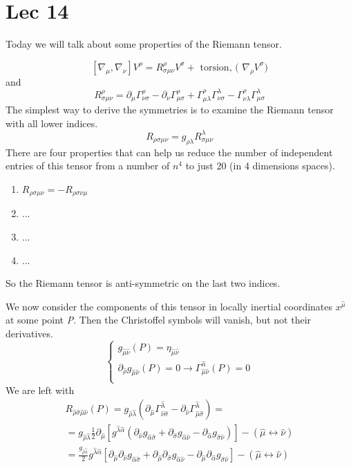 \section{Lec 14}
Today we will talk about some properties of the Riemann tensor.\par
\[
	[\nabla _{\mu }, \nabla _{\nu }] V^{\rho } = R^{\rho }_{\sigma \mu \nu } V^{\sigma } + \text{ torsion, ( } \nabla _{\rho }V^{\sigma }\text{)}
\]
and 
\[
	R^{\rho }_{\sigma \mu \nu } = \partial_{\mu }\Gamma^{\rho }_{\nu \sigma } - \partial_{\nu }\Gamma ^{\rho }_{\mu \sigma } + \Gamma  ^{\rho }_{\mu \lambda } \Gamma ^{\lambda }_{\nu \sigma } -\Gamma ^{\rho }_{\nu \lambda }\Gamma ^{\lambda }_{\mu \sigma }
\]
The simplest way to derive the symmetries is to examine the Riemann tensor with all lower indices.
\[
R_{\rho \sigma \mu \nu } = g_{\rho \lambda } R^{\lambda }_{\sigma \mu \nu }
\]
There are four properties that can help us reduce the number of independent entries of this tensor from a number of $n^{4}$ to just 20 (in 4 dimensions spaces).
\begin{enumerate}
\item $R_{\rho \sigma \mu \nu } = - R_{\rho \sigma \nu \mu } $ 
\item ... 
	\item ...
	\item ...
\end{enumerate}
So the Riemann tensor is anti-symmetric on the last two indices.\par
We now consider the components of this tensor in locally inertial coordinates $x^{\hat{\mu }}$ at some point \emph{P}. Then the Christoffel symbols will vanish, but not their derivatives.
\begin{equation}
\begin{cases}
g_{\hat{\mu }\hat{\nu }} \left( P \right) = \eta _{\hat{\mu }\hat{\nu }} \\
\partial_{\hat{\rho }} g_{\hat{\mu }\hat{\nu }}\left( P \right) = 0 \to \Gamma ^{\hat{\alpha }}_{\hat{\mu }\hat{\nu }} \left( P \right) = 0 \\
\end{cases}
\end{equation}
We are left with
\begin{gather*}
R_{\hat{\rho }\hat{\sigma }\hat{\mu }\hat{\nu }} \left( P \right) = g_{\hat{\rho }\hat{\lambda }} \left( \partial_{\hat{\mu }} \Gamma ^{\hat{\lambda }}_{\hat{\nu }\hat{\sigma }} - \partial_{\hat{\nu }} \Gamma ^{\hat{\lambda }}_{\hat{\mu }\hat{\sigma }} \right)  = \\
= g_{\hat{\rho }\hat{\lambda }} \frac{1}{2} \partial_{\hat{\mu } } [ g^{\hat{\lambda }\hat{\alpha }} \left( \partial_{\hat{\nu }} g_{\hat{\alpha  }\hat{\sigma }} + \partial_{\hat{\sigma }} g_{\hat{\alpha }\hat{\nu }} - \partial_{\hat{\alpha }} g_{\hat{\sigma }\hat{\nu }} \right) ] - \left( \hat{\mu } \leftrightarrow \hat{\nu } \right) \\
= \frac{g_{\hat{\rho }\hat{\lambda }}}{2} g^{\hat{\lambda }\hat{\alpha }} [ \partial_{\hat{\mu }} \partial_{\hat{\nu }} g_{\hat{\alpha }\hat{\sigma }} + \partial_{\hat{\mu }}\partial_{\hat{\sigma }} g_{\hat{\alpha }\hat{\nu }} - \partial_{\hat{\mu }}\partial_{\hat{\alpha }} g_{\hat{\sigma }\hat{\nu }}] - \left( \hat{\mu } \leftrightarrow \hat{\nu } \right)
\end{gather*} 

